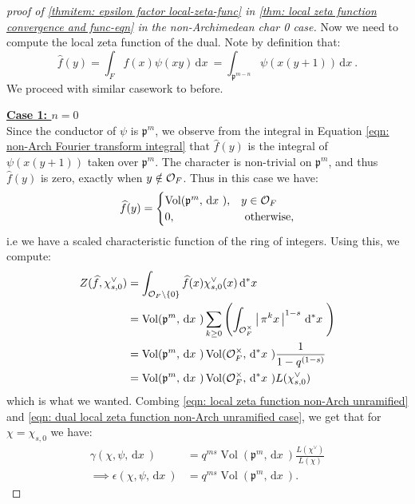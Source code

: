 \documentclass[11pt, x11names]{book}
\newcommand{\pp}{\mathfrak{p}}
\newcommand{\set}[1]{\left\{ #1 \right\}}
\renewcommand{\brack}[1]{\left(   #1 \right)}
\newcommand{\abs}[1]{\left| \, #1  \,\right|}
\renewcommand{\hat}{\widehat}
\newcommand{\dx}{\, \mathrm{d}x \ }
\renewcommand{\d}[1]{\, \mathrm{d}#1 \ }
\DeclareMathOperator{\vol}{Vol}
\begin{document}
\begin{proof}[proof of \ref{thmitem: epsilon factor local-zeta-func} in \ref{thm: local zeta function convergence and func-eqn} in the non-Archimedean char 0 case]
Now we need to compute the local zeta function of the dual. Note by definition that:
\begin{equation}
\label{eqn: non-Arch Fourier transform integral}
    \hat{f}(y) = \int_F f(x)\psi(xy) \dx = \int_{\pp^{m-n}} \psi(x(y+1)) \dx. 
\end{equation}
We proceed with similar casework to before.

\underline{\textbf{Case 1: $n=0$}}\\
Since the conductor of $\psi$ is $\pp^m$, we observe from the integral in Equation \ref{eqn: non-Arch Fourier transform integral} that $\hat{f}(y)$ is the integral of $\psi(x(y+1))$ taken over $\pp^m$. The character is non-trivial on $\pp^m$, and thus $\hat{f}(y)$ is zero, exactly when $y \notin \mathcal{O}_F$. Thus in this case we have:
\begin{equation*}
    \hat{f}(y) = \begin{cases}
    \vol(\pp^m, \dx), & y \in \calo_F\\
    0, & \text{ otherwise},
    \end{cases}
\end{equation*}
i.e we have a scaled characteristic function of the ring of integers. Using this, we compute:
\begin{align}
\label{eqn: dual local zeta function non-Arch unramified case}
    Z(\hat{f}, \chi^\lor_{s, 0}) &= \int_{\calo_F \setminus \set{0}} \hat{f}(x) \chi^\lor_{s, 0}(x) \d{^*x} \nonumber \\
    &= \vol(\pp^m, \dx) \sum_{k \geq 0} \brack{\int_{\calo_F^\times} \abs{\pi^k x}^{1-s} \d{^*x}} \nonumber \\
    &= \vol(\pp^m, \dx) \vol(\calo_F^\times, \d{^*x}) \frac{1}{1 - q^{(1-s)}} \nonumber \\
    &= \vol(\pp^m, \dx) \vol(\calo_F^\times, \d{^*x}) L(\chi^\lor_{s, 0})
\end{align}
which is what we wanted. Combing \ref{eqn: local zeta function non-Arch unramified} and \ref{eqn: dual local zeta function non-Arch unramified case}, we get that for $\chi = \chi_{s, 0}$ we have:
\begin{align}
\label{eqn: local epsilon factor non-Arch unramified}
    \gamma(\chi, \psi, \dx) &= q^{ms} \vol(\pp^m, \dx) \frac{L(\chi^\lor)}{L(\chi)} \nonumber \\
    \implies \epsilon(\chi, \psi, \dx) &= q^{ms}\vol(\pp^m, \dx).
\end{align}


\end{proof}
\end{document}
